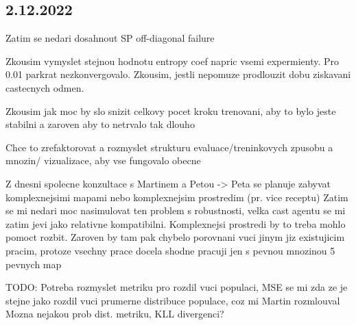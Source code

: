 \documentclass{report}
\begin{document}
\subsection*{2.12.2022}
\begin{list}{}{}
    \item Zatim se nedari dosahnout SP off-diagonal failure
    \item Zkousim vymyslet stejnou hodnotu entropy coef napric vsemi expermienty. Pro 0.01 parkrat nezkonvergovalo.
        Zkousim, jestli nepomuze prodlouzit dobu ziskavani castecnych odmen.
    \item Zkousim jak moc by slo snizit celkovy pocet kroku trenovani, aby to bylo jeste stabilni a zaroven aby to netrvalo tak dlouho  
    \item Chce to zrefaktorovat a rozmyslet strukturu evaluace/treninkovych zpusobu a mnozin/ vizualizace, aby vse fungovalo obecne
    \item Z dnesni spolecne konzultace s Martinem a Petou -> Peta se planuje zabyvat komplexnejsimi mapami nebo komplexnejsim prostredim (pr. vice receptu)
        Zatim se mi nedari moc nasimulovat ten problem s robustnosti, velka cast agentu se mi zatim jevi jako relativne kompatibilni.
        Komplexnejsi prostredi by to treba mohlo pomoct rozbit.
        Zaroven by tam pak chybelo porovnani vuci jinym jiz existujicim pracim, protoze vsechny prace docela shodne pracuji jen s pevnou mnozinou 5 pevnych map 
    \item TODO: Potreba rozmyslet metriku pro rozdil vuci populaci, MSE se mi zda ze je stejne jako rozdil vuci prumerne distribuce populace, coz mi Martin rozmlouval
        Mozna nejakou prob dist. metriku, KLL divergenci?  

\end{list}
\end{document}

